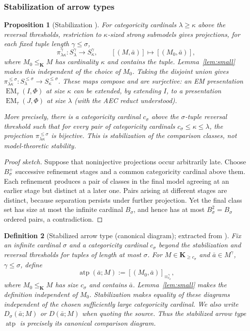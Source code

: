 \documentclass[11pt]{article}
\newcommand{\K}{\mathbf K}
\newcommand{\atp}{\operatorname{atp}}
\newcommand{\EM}{\operatorname{EM}_{\tau}}
\theoremstyle{plain}
\newtheorem{definition}{Definition}[section]
\newtheorem{proposition}[definition]{Proposition}
\begin{document}
\subsubsection*{Stabilization of arrow types}
\begin{proposition}[Stabilization {\cite[Proposition 4.2]{oai-ecc}}]
For categoricity cardinals $\lambda\geq\kappa$ above the reversal thresholds, restriction to $\kappa$-sized strong submodels gives projections, for each fixed tuple length $\gamma\leq\sigma$,
\[
\pi^{\gamma}_{\lambda\kappa}:S^\gamma_\lambda
\longrightarrow S^\gamma_\kappa,
\qquad
[(M,\bar a)]\longmapsto[(M_0,\bar a)],
\]
where $M_0\leq_\K M$ has cardinality $\kappa$ and contains the tuple. Lemma~\ref{lem:small} makes this independent of the choice of $M_0$. Taking the disjoint union gives
$\pi^{\leq\sigma}_{\lambda\kappa}:S^{\leq\sigma}_\lambda\to S^{\leq\sigma}_\kappa$.
These maps compose and are surjective: an EM presentation $\EM(I,\Phi)$ at size $\kappa$ can be extended, by extending $I$, to a presentation $\EM(J,\Phi)$ at size $\lambda$ (with the AEC reduct understood).

More precisely, there is a categoricity cardinal $c_\sigma$ above the
$\sigma$-tuple reversal threshold such that for every pair of categoricity
cardinals $c_\sigma\leq\kappa\leq\lambda$, the projection
$\pi^{\leq\sigma}_{\lambda\kappa}$ is bijective. This is
\emph{stabilization of the comparison classes}, not model-theoretic
stability. 
\end{proposition}

\begin{proof}[Proof sketch]
Suppose that noninjective projections occur
arbitrarily late. Choose $B_\sigma^+$ successive refinement stages and a
common categoricity cardinal above them. Each refinement produces a pair
of classes in the final model agreeing at an earlier stage but distinct
at a later one. Pairs arising at different stages are distinct, because
separation persists under further projection. Yet the final class set has
size at most the infinite cardinal $B_\sigma$, and hence has at most
$B_\sigma^2=B_\sigma$ ordered pairs, a contradiction.


\end{proof}
\begin{definition}[Stabilized arrow type (canonical diagram); extracted from
{\cite[Proposition 4.2]{oai-ecc}}]
Fix an infinite cardinal $\sigma$ and a categoricity cardinal
$c_\sigma$ beyond the stabilization and reversal thresholds for
tuples of length at most $\sigma$. For $M\in\K_{\geq c_\sigma}$
and $\bar a\in M^\gamma$, $\gamma\leq\sigma$, define
\[
\atp(\bar a;M)
 :=[(M_0,\bar a)]_{\equiv^{\gamma}_{c_\sigma}},
\]
where $M_0\leq_\K M$ has size $c_\sigma$ and contains $\bar a$.
Lemma~\ref{lem:small} makes the definition independent of $M_0$.
Stabilization makes equality of these diagrams independent of the
chosen sufficiently large categoricity cardinal. We also write $D_\sigma(\bar a;M)$ or $D(\bar a;M)$
when quoting the source. Thus the stabilized arrow type
$\atp$ is precisely its canonical comparison diagram.
\end{definition}
\end{document}

